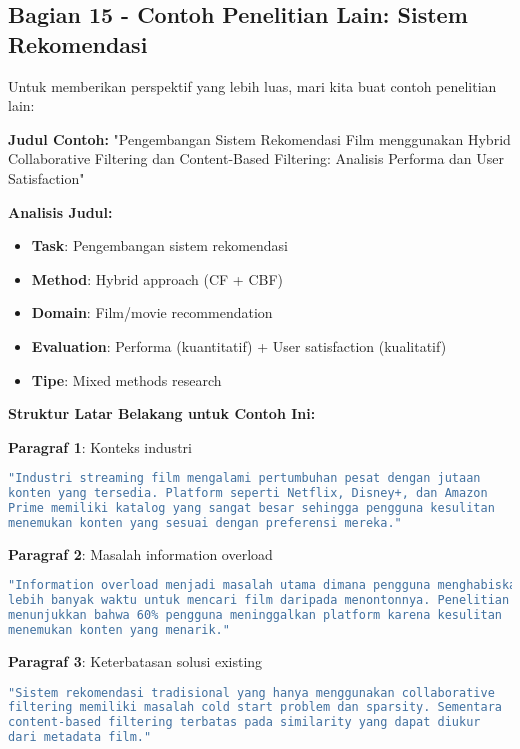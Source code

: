 \subsection*{Bagian 15 - Contoh Penelitian Lain: Sistem Rekomendasi}

Untuk memberikan perspektif yang lebih luas, mari kita buat contoh penelitian lain:

\textbf{Judul Contoh:}
"Pengembangan Sistem Rekomendasi Film menggunakan Hybrid Collaborative Filtering dan Content-Based Filtering: Analisis Performa dan User Satisfaction"

\textbf{Analisis Judul:}
\begin{itemize}
    \item \textbf{Task}: Pengembangan sistem rekomendasi
    \item \textbf{Method}: Hybrid approach (CF + CBF)
    \item \textbf{Domain}: Film/movie recommendation
    \item \textbf{Evaluation}: Performa (kuantitatif) + User satisfaction (kualitatif)
    \item \textbf{Tipe}: Mixed methods research
\end{itemize}

\textbf{Struktur Latar Belakang untuk Contoh Ini:}

\textbf{Paragraf 1}: Konteks industri
\begin{lstlisting}[language=bash, style=bash, caption=Latar Belakang Sistem Rekomendasi]
"Industri streaming film mengalami pertumbuhan pesat dengan jutaan
konten yang tersedia. Platform seperti Netflix, Disney+, dan Amazon
Prime memiliki katalog yang sangat besar sehingga pengguna kesulitan
menemukan konten yang sesuai dengan preferensi mereka."
\end{lstlisting}

\textbf{Paragraf 2}: Masalah information overload
\begin{lstlisting}[language=bash, style=bash, caption=Masalah Information Overload]
"Information overload menjadi masalah utama dimana pengguna menghabiskan
lebih banyak waktu untuk mencari film daripada menontonnya. Penelitian
menunjukkan bahwa 60% pengguna meninggalkan platform karena kesulitan
menemukan konten yang menarik."
\end{lstlisting}

\textbf{Paragraf 3}: Keterbatasan solusi existing
\begin{lstlisting}[language=bash, style=bash, caption=Keterbatasan Solusi Existing]
"Sistem rekomendasi tradisional yang hanya menggunakan collaborative
filtering memiliki masalah cold start problem dan sparsity. Sementara
content-based filtering terbatas pada similarity yang dapat diukur
dari metadata film."
\end{lstlisting}


